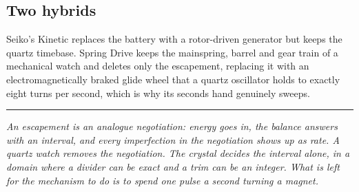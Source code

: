 \documentclass[11pt,a4paper]{article}
\begin{document}
\subsection*{Two hybrids}

Seiko's Kinetic replaces the battery with a rotor-driven generator but keeps the quartz
timebase. Spring Drive keeps the mainspring, barrel and gear train of a mechanical watch and
deletes only the escapement, replacing it with an electromagnetically braked glide wheel that a
quartz oscillator holds to exactly eight turns per second, which is why its seconds hand
genuinely sweeps.

\vspace{6mm}
\begin{center}
\rule{0.4\textwidth}{0.6pt}
\end{center}
\vspace{2mm}

\noindent\emph{An escapement is an analogue negotiation: energy goes in, the balance answers
with an interval, and every imperfection in the negotiation shows up as rate. A quartz watch
removes the negotiation. The crystal decides the interval alone, in a domain where a divider
can be exact and a trim can be an integer. What is left for the mechanism to do is to spend one
pulse a second turning a magnet.}
\end{document}
